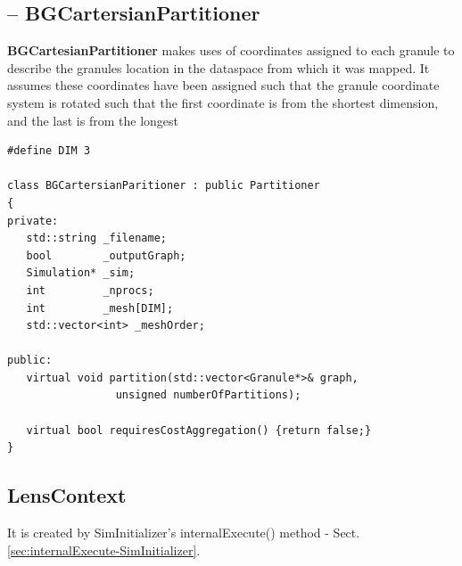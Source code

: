 \subsection{-- BGCartersianPartitioner}
\label{sec:BGCartersianPartitioner}


{\bf BGCartesianPartitioner} makes uses of coordinates assigned
  to each granule to describe the granules location in the
   dataspace from which it was mapped. It assumes these coordinates have been
   assigned such that the granule coordinate system is rotated such that the
   first coordinate is from the shortest dimension, and the last is from the
   longest

\begin{lstlisting}
#define DIM 3

class BGCartersianParitioner : public Partitioner
{
private:
   std::string _filename;
   bool        _outputGraph;
   Simulation* _sim;
   int         _nprocs;
   int         _mesh[DIM];
   std::vector<int> _meshOrder;

public:
   virtual void partition(std::vector<Granule*>& graph, 
			     unsigned numberOfPartitions);
      
   virtual bool requiresCostAggregation() {return false;}
}
\end{lstlisting}


\subsection{LensContext}
\label{sec:LensContext}

It is created by SimInitializer's internalExecute() method -
Sect.\ref{sec:internalExecute-SimInitializer}.

